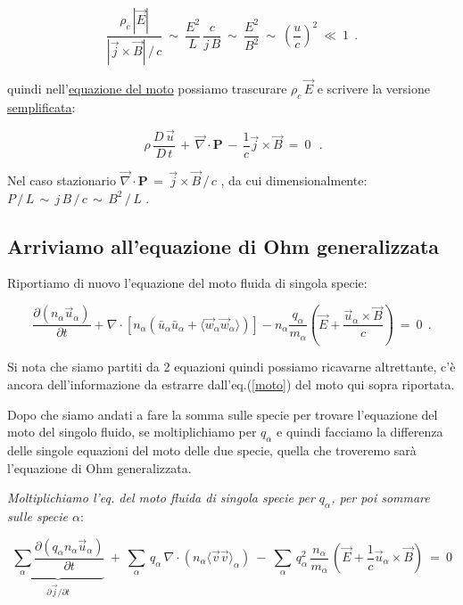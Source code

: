 \[ \frac{\rho_c\, |\vec E|}{|\vec j\times \vec B|\, /\, c}\ \sim \ \frac{E^2}{L}\,\frac{c}{j\,B}\ \sim\ \frac{E^2}{B^2}\ \sim\ \left(\frac{u}{c}\right)^2\ \ll\ 1 \ \ .\]

quindi nell'\underline{equazione del moto} possiamo trascurare $\rho_c\, \vec E$ e scrivere la versione \underline{semplificata}:

\begin{equation}
	\label{moto MHD semplificato}
	\boxed{\ \rho\, \frac{D\, \vec u}{D\, t}\, +\, \vec\nabla\cdot \mathbf{P} \, -\, \frac{1}{c}\vec j\times\vec B\ =\ 0\ }\ \ .
\end{equation}

Nel caso stazionario $\vec \nabla \cdot \mathbf{P}\, =\, \vec j\times \vec B\, /\, c$ , da cui dimensionalmente: $P\,/\,L\,\sim\, j\,B\,/\,c\,\sim\, B^2\,/\,L$ .

%
%
\vspace{0.5cm}
\subsection{Arriviamo all'equazione di Ohm generalizzata}

Riportiamo di nuovo l'equazione del moto fluida di singola specie:

\[\frac{\partial (n_\alpha \vec u_\alpha)}{\partial t} +  \nabla\cdot \left[n_\alpha \left( \bar u _\alpha \bar u_\alpha + \langle \vec w_\alpha \vec w_\alpha \rangle \right) \right] - n_\alpha\frac{q_\alpha}{m_\alpha} \left(\vec E + \frac{\vec u_\alpha \times \vec B}{c}\right)\ =\ 0\ \ .\]

Si nota che siamo partiti da 2 equazioni quindi possiamo ricavarne altrettante, c'è ancora dell'informazione da estrarre dall'eq.(\ref{moto}) del moto qui sopra riportata. 

Dopo che siamo andati a fare la somma sulle specie per trovare l'equazione del moto del singolo fluido, se moltiplichiamo per $q_\alpha$ e quindi facciamo la differenza delle singole equazioni del moto delle due specie, quella che troveremo sarà l'equazione di Ohm generalizzata. 

\emph{Moltiplichiamo l'eq. del moto fluida di singola specie per $q_\alpha$, per poi sommare sulle specie $\alpha$}:

\begin{equation}\label{precursore Ohm}
\underset{\partial \vec j/\partial t}{\underbrace{\sum_\alpha \frac{\partial(q_\alpha n_\alpha \vec u_\alpha)}{\partial t} }}\ +\ \sum_\alpha\, q_\alpha\, \nabla \cdot (n_\alpha \langle \vec v \vec v\rangle_\alpha)\ -\ \sum_\alpha\, q^2_\alpha \,\frac{n_\alpha}{m_\alpha}\, \left(\vec E + \frac{1}{c}\vec u_\alpha\times \vec B\right)\ =\ 0
\end{equation}

